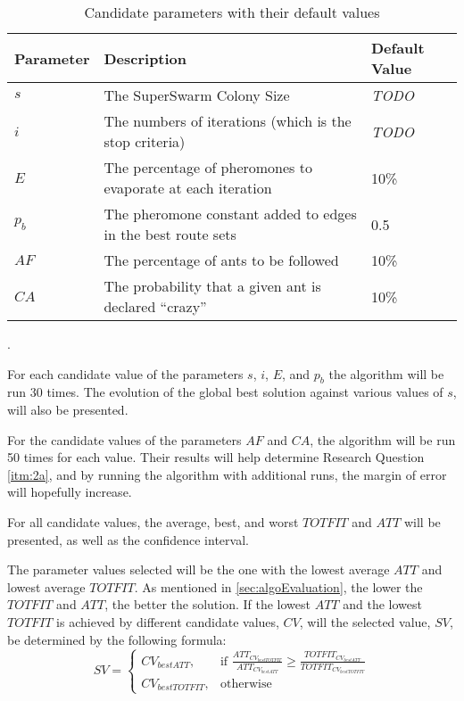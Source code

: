 \begin{table}[H]
	\small
	\begin{tabular}{|l|l|l|}
    	\hline
    	Parameter & Description & Default Value\\
    	\hline
    	$s$ & The SuperSwarm Colony Size & \emph{\color{blue}TODO}\\
    	$i$ & The numbers of iterations (which is the stop criteria) & \emph{\color{blue}TODO}\\
    	$E$ & The percentage of pheromones to evaporate at each iteration & 10\%\\
    	$p_b$ & The pheromone constant added to edges in the best route sets & 0.5\\
    	$AF$ & The percentage of ants to be followed & 10\%\\
    	$CA$ & The probability that a given ant is declared ``crazy'' & 10\%\\
   	    \hline
    \end{tabular}
    \caption {Candidate parameters with their default values}.
    \label{table:parameters}
\end{table}

For each candidate value of the parameters $s$, $i$, $E$, and $p_b$ the algorithm will be run 30 times. The evolution of the global best solution against various values of $s$, will also be presented. 

For the candidate values of the parameters $AF$ and $CA$, the algorithm will be run 50 times for each value. Their results will help determine Research Question \vref{itm:2a}, and by running the algorithm with additional runs, the margin of error will hopefully increase.

For all candidate values, the average, best, and worst $TOTFIT$ and $ATT$ will be presented, as well as the confidence interval. 

The parameter values selected will be the one with the lowest average $ATT$ and lowest average $TOTFIT$. As mentioned in \vref{sec:algoEvaluation}, the lower the $TOTFIT$ and $ATT$, the better the solution. If the lowest $ATT$ and the lowest$TOTFIT$ is achieved by different candidate values, $CV$, will the selected value, $SV$, be determined by the following formula:
\[
    SV= 
\begin{cases}
    CV_{bestATT},& \text{if } \frac{ATT_{CV_{bestTOTFIT}}}{ATT_{CV_{bestATT}}}\geq \frac{TOTFIT_{CV_{bestATT}}}{TOTFIT_{CV_{bestTOTFIT}}}\\
    CV_{bestTOTFIT},& \text{otherwise}
\end{cases}
\]

